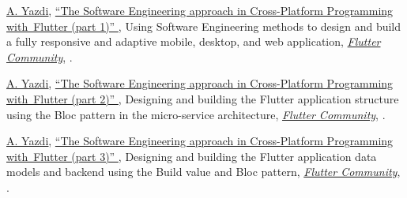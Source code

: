 \documentclass[letterpaper,MMMyyyy,nonstopmode]{resume}
\begin{document}
\begin{Body}
\NumberedItem{[1]}
\href{https://medium.com/@aliyazdi75}
{\underline{A. Yazdi}},
\href{https://medium.com/@aliyazdi75/efcdc8a8fc26?source=friends_link&sk=ceb60f56685ce66c7f9574595748f25b}
{
``The Software Engineering approach in Cross-Platform Programming  with Flutter (part 1)''
},
\newline Using Software Engineering methods to design and build a fully responsive and adaptive mobile, desktop, and web application,
\href{https://medium.com/flutter-community}
{\textit{Flutter Community}},
.

\Gap
\NumberedItem{[2]}
\href{https://medium.com/@aliyazdi75}
{\underline{A. Yazdi}},
\href{https://medium.com/@aliyazdi75/f7b75056102?source=friends_link&sk=79ed6a47bd6fe9b4247f3cc2a113e3df}
{
``The Software Engineering approach in Cross-Platform Programming  with Flutter (part 2)''
},
\newline Designing and building the Flutter application structure using the Bloc pattern in the micro-service architecture,
\href{https://medium.com/flutter-community}
{\textit{Flutter Community}},
.

\Gap
\NumberedItem{[3]}
\href{https://medium.com/@aliyazdi75}
{\underline{A. Yazdi}},
\href{https://medium.com/@aliyazdi75/34c6eff02af0?source=friends_link&sk=a34a4a71f306e81b868fd6865abb6aaa}
{
``The Software Engineering approach in Cross-Platform Programming  with Flutter (part 3)''
},
\newline Designing and building the Flutter application data models and backend using the Build value and Bloc pattern,
\href{https://medium.com/flutter-community}
{\textit{Flutter Community}},
.

\endgroup






\end{Body}
\end{document}
